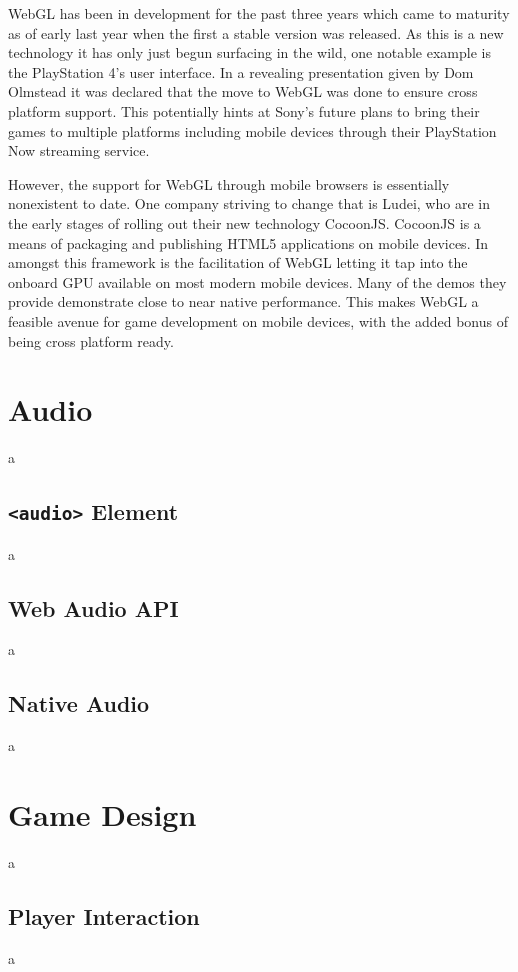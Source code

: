 \documentclass[final]{cmpreport}
\begin{document}
WebGL has been in development for the past three years which came to maturity as of early last year when the first a stable version was released. As this is a new technology it has only just begun surfacing in the wild, one notable example is the PlayStation 4's user interface. In a revealing presentation given by Dom Olmstead it was declared that the move to WebGL was done to ensure cross platform support. This potentially hints at Sony's future plans to bring their games to multiple platforms including mobile devices through their PlayStation Now streaming service.

However, the support for WebGL through mobile browsers is essentially nonexistent to date. One company striving to change that is Ludei, who are in the early stages of rolling out their new technology CocoonJS. CocoonJS is a means of packaging and publishing HTML5 applications on mobile devices. In amongst this framework is the facilitation of WebGL letting it tap into the onboard GPU available on most modern mobile devices. Many of the demos they provide demonstrate close to near native performance. This makes WebGL a feasible avenue for game development on mobile devices, with the added bonus of being cross platform ready.

\section{Audio}
a

\subsection{\texttt{<audio>} Element}
a

\subsection{Web Audio API}
a

\subsection{Native Audio}
a

\section{Game Design}
a

\subsection{Player Interaction}
a
\end{document}
